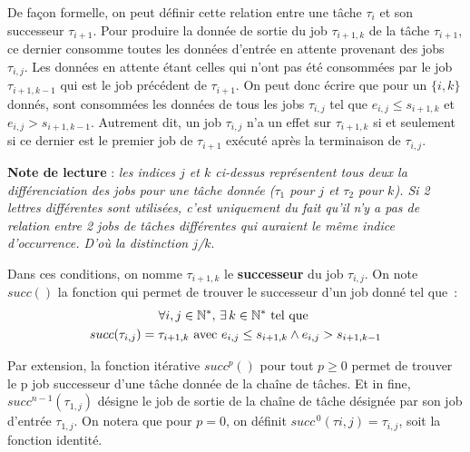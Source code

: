 \documentclass[french, a4paper, 11pt, twoside, pdftex]{StyleThese}
\begin{document}
	    De façon formelle, on peut définir cette relation entre une tâche $\tau_i$ et son successeur $\tau_{i+1}$. Pour produire la donnée de sortie du job $\tau_{i+1,k}$ de la tâche $\tau_{i+1}$, ce dernier consomme toutes les données d'entrée en attente provenant des jobs $\tau_{i,j}$. Les données en attente étant celles qui n'ont pas été consommées par le job $\tau_{i+1,k-1}$ qui est le job précédent de $\tau_{i+1}$. On peut donc écrire que pour un $\{i,k\}$ donnés, sont consommées les données de tous les jobs $\tau_{i,j}$ tel que $ e_{i,j} \leq s_{i+1, k}$ et $e_{i,j} > s_{i+1, k-1}$. Autrement dit, un job $\tau_{i,j}$ n'a un effet sur $\tau_{i+1,k}$ si et seulement si ce dernier est le premier job de $\tau_{i+1}$ exécuté après la terminaison de $\tau_{i,j}$.
	    
	    \textbf{Note de lecture} : \textit{les indices $j$ et $k$ ci-dessus représentent tous deux la différenciation des jobs pour une tâche donnée ($\tau_1$ pour $j$ et $\tau_2$ pour $k$). Si 2 lettres différentes sont utilisées, c'est uniquement du fait qu'il n'y a pas de relation entre 2 jobs de tâches différentes qui auraient le même indice d'occurrence. D'où la distinction $j$/$k$}.
	    
		Dans ces conditions, on nomme $\tau_{i+1,k}$ le \textbf{successeur} du job $\tau_{i,j}$. On note $succ()$ la fonction qui permet de trouver le successeur d'un job donné tel que~: 
		\begin{multline*}
		\forall i,j \in \mathbb{N}^*, \, \exists \, k \in  \mathbb{N}^*  \textrm{ tel que }  \\
		 succ(\tau_{i,j}) = \tau_{i+1,k} \textup{ avec } e_{i,j} \leq s_{i+1,k} \wedge e_{i,j} > s_{i+1,k-1}
		\end{multline*}
	
	
		Par extension, la fonction itérative $succ^{p}()$ pour tout $p \geq 0$ permet de trouver le p job successeur d'une tâche donnée de la chaîne de tâches. Et in fine, $succ^{n-1}(\tau_{1,j})$ désigne le job de sortie de la chaîne de tâche désignée par son job d'entrée $\tau_{1,j}$. On notera que pour $p = 0$, on définit $succ^{\,0}(\tau{i,j}) = \tau_{i,j}$, soit la fonction identité.
		
\end{document}
